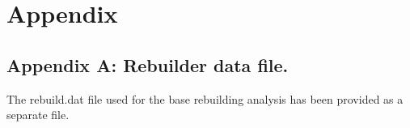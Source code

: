 \documentclass[11pt,
  english,
  letterpaper,
]{article}
\begin{document}
\tagmcend\tagstructend

\clearpage

\clearpage


\hypertarget{appendix}{%
\section{Appendix}\label{appendix}}

\leavevmode\tagmcend\tagstructend


\hypertarget{append_a}{%
\subsection{Appendix A: Rebuilder data file.}\label{append_a}}

\leavevmode\tagmcend\tagstructend


The rebuild.dat file used for the base rebuilding analysis has been provided as a separate file.

\leavevmode\tagmcend\tagstructend\par

\clearpage
\end{document}
